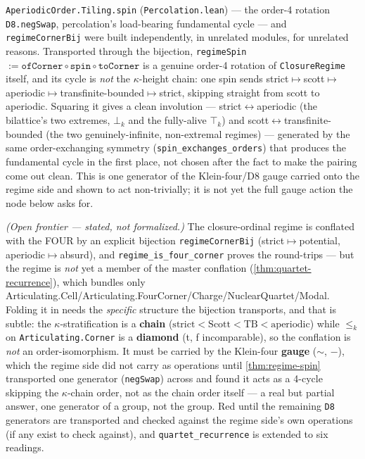 \begin{theorem}\label{thm:regime-spin}\leanok{}
\texttt{AperiodicOrder.Tiling.spin} (\texttt{Percolation.lean}) --- the order-4 rotation \texttt{D8.negSwap}, percolation's load-bearing fundamental cycle --- and \texttt{regimeCornerBij} were built independently, in unrelated modules, for unrelated reasons. Transported through the bijection, \texttt{regimeSpin} $:= \texttt{ofCorner} \circ \texttt{spin} \circ \texttt{toCorner}$ is a genuine order-4 rotation of \texttt{ClosureRegime} itself, and its cycle is \emph{not} the $\kappa$-height chain: one spin sends strict$\mapsto$scott$\mapsto$aperiodic$\mapsto$transfinite-bounded$\mapsto$strict, skipping straight from scott to aperiodic. Squaring it gives a clean involution --- strict$\leftrightarrow$aperiodic (the bilattice's two extremes, $\bot_k$ and the fully-alive $\top_k$) and scott$\leftrightarrow$transfinite-bounded (the two genuinely-infinite, non-extremal regimes) --- generated by the same order-exchanging symmetry (\texttt{spin\_exchanges\_orders}) that produces the fundamental cycle in the first place, not chosen after the fact to make the pairing come out clean. This is one generator of the Klein-four/D8 gauge carried onto the regime side and shown to act non-trivially; it is not yet the full gauge action the node below asks for.
\end{theorem}
\begin{theorem}\label{thm:regime-quartet-member}\notready{}
\emph{(Open frontier --- stated, not formalized.)} The closure-ordinal regime is conflated with the FOUR by an explicit bijection \texttt{regimeCornerBij} (strict$\mapsto$potential, aperiodic$\mapsto$absurd), and \texttt{regime\_is\_four\_corner} proves the round-trips --- but the regime is \emph{not} yet a member of the master conflation (\cref{thm:quartet-recurrence}), which bundles only Articulating.Cell/Articulating.FourCorner/Charge/NuclearQuartet/Modal. Folding it in needs the \emph{specific} structure the bijection transports, and that is subtle: the $\kappa$-stratification is a \textbf{chain} ($\mathrm{strict}<\mathrm{Scott}<\mathrm{TB}<\mathrm{aperiodic}$) while $\leq_k$ on \texttt{Articulating.Corner} is a \textbf{diamond} (t, f incomparable), so the conflation is \emph{not} an order-isomorphism. It must be carried by the Klein-four \textbf{gauge} ($\sim$, $-$), which the regime side did not carry as operations until \cref{thm:regime-spin} transported one generator (\texttt{negSwap}) across and found it acts as a 4-cycle skipping the $\kappa$-chain order, not as the chain order itself --- a real but partial answer, one generator of a group, not the group. Red until the remaining \texttt{D8} generators are transported and checked against the regime side's own operations (if any exist to check against), and \texttt{quartet\_recurrence} is extended to six readings.
\end{theorem}
